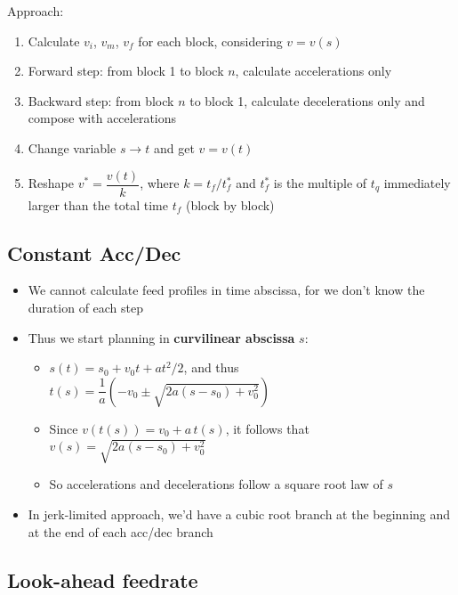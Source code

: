 \documentclass[
  letterpaper,
  DIV=11,
  numbers=noendperiod]{scrartcl}
\providecommand{\tightlist}{%
  \setlength{\itemsep}{0pt}\setlength{\parskip}{0pt}}
\begin{document}
Approach:

\begin{enumerate}
\def\labelenumi{\arabic{enumi}.}
\tightlist
\item
  Calculate \(v_i\), \(v_m\), \(v_f\) for each block, considering
  \(v = v(s)\)
\item
  Forward step: from block 1 to block \(n\), calculate accelerations
  only
\item
  Backward step: from block \(n\) to block 1, calculate decelerations
  only and compose with accelerations
\item
  Change variable \(s \to t\) and get \(v = v(t)\)
\item
  Reshape \(v^* = \dfrac{v(t)}{k}\), where \(k = t_f / t_f^*\) and
  \(t_f^*\) is the multiple of \(t_q\) immediately larger than the total
  time \(t_f\) (block by block)
\end{enumerate}

\subsection{Constant Acc/Dec}\label{constant-accdec}

\begin{itemize}
\tightlist
\item
  We cannot calculate feed profiles in time abscissa, for we don't know
  the duration of each step
\item
  Thus we start planning in \textbf{curvilinear abscissa} \(s\):

  \begin{itemize}
  \tightlist
  \item
    \(s(t) = s_0 + v_0 t + a t^2/2\), and thus
    \(t(s) = \dfrac{1}{a}\left(-v_0 \pm \sqrt{2a(s - s_0) + v_0^2}\right)\)
  \item
    Since \(v(t(s)) = v_0 + a\, t(s)\), it follows that
    \(v(s) = \sqrt{2a(s - s_0) + v_0^2}\)
  \item
    So accelerations and decelerations follow a square root law of \(s\)
  \end{itemize}
\item
  In jerk-limited approach, we'd have a cubic root branch at the
  beginning and at the end of each acc/dec branch
\end{itemize}

\subsection{Look-ahead feedrate}\label{look-ahead-feedrate}
\end{document}
